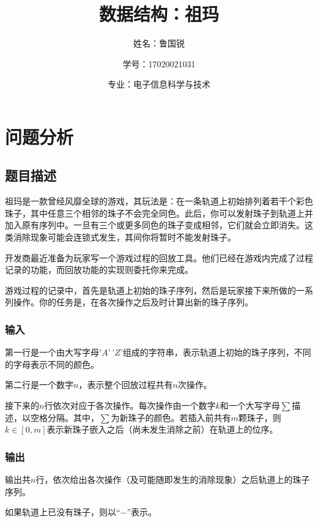 \documentclass[UTF8]{ctexart}
\title{数据结构：祖玛}
\author{姓名：鲁国锐 \protect\newline
\and 学号：17020021031 \\
\and 专业：电子信息科学与技术}
\begin{document}
	\maketitle
	\renewcommand{\contentsname}{Contents}
	\tableofcontents
	\newpage
	
	\hypersetup{
	bookmarks=true,
	colorlinks=true,
	linkcolor=red,
	urlcolor=blue
	}
	\section{问题分析}
	\subsection{题目描述}
	\indent 祖玛是一款曾经风靡全球的游戏，其玩法是：在一条轨道上初始排列着若干个彩色珠子，其中任意三个相邻的珠子不会完全同色。此后，你可以发射珠子到轨道上并加入原有序列中。一旦有三个或更多同色的珠子变成相邻，它们就会立即消失。这类消除现象可能会连锁式发生，其间你将暂时不能发射珠子。

\indent 开发商最近准备为玩家写一个游戏过程的回放工具。他们已经在游戏内完成了过程记录的功能，而回放功能的实现则委托你来完成。

\indent 游戏过程的记录中，首先是轨道上初始的珠子序列，然后是玩家接下来所做的一系列操作。你的任务是，在各次操作之后及时计算出新的珠子序列。
	\subsubsection{输入}
	\indent 第一行是一个由大写字母$’A’~’Z’$组成的字符串，表示轨道上初始的珠子序列，不同的字母表示不同的颜色。

\indent 第二行是一个数字$n$，表示整个回放过程共有$n$次操作。

\indent 接下来的$n$行依次对应于各次操作。每次操作由一个数字$k$和一个大写字母$\sum$描述，以空格分隔。其中，$\sum$为新珠子的颜色。若插入前共有$m$颗珠子，则$k\in[0, m]$表示新珠子嵌入之后（尚未发生消除之前）在轨道上的位序。
	\subsubsection{输出}
	\indent 输出共$n$行，依次给出各次操作（及可能随即发生的消除现象）之后轨道上的珠子序列。

\indent 如果轨道上已没有珠子，则以“$-$”表示。
\end{document}
